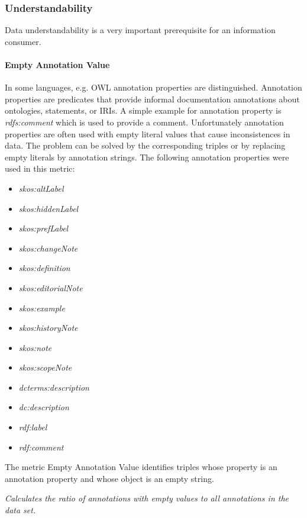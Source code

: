 
\subsubsection{Understandability}

Data understandability is a very important prerequisite for an information consumer.

\paragraph{Empty Annotation Value}

In some languages, e.g. OWL annotation properties are distinguished.
Annotation properties are predicates that provide informal documentation annotations about ontologies, statements, or IRIs. 
A simple example for annotation property is \textit{rdfs:comment} which is used to provide a comment. 
Unfortunately annotation properties are often used with empty literal values that cause inconsistences in data.
The problem can be solved by the corresponding triples or by replacing empty literals by annotation strings.
The following annotation properties were used in this metric:
\begin{itemize}
\item \textit{skos:altLabel}
\item \textit{skos:hiddenLabel}
\item \textit{skos:prefLabel}
\item \textit{skos:changeNote}
\item \textit{skos:definition}
\item \textit{skos:editorialNote}
\item \textit{skos:example}
\item \textit{skos:historyNote}
\item \textit{skos:note}
\item \textit{skos:scopeNote}
\item \textit{dcterms:description}
\item \textit{dc:description}
\item \textit{rdf:label}
\item \textit{rdf:comment}
\end{itemize}

The metric Empty Annotation Value identifies triples whose property is an annotation property and whose object is an empty string.
 
\begin{mdframed}[style=metricdefinition]
\emph{Calculates the ratio of annotations with empty values to all annotations in the data set.}
\end{mdframed}


